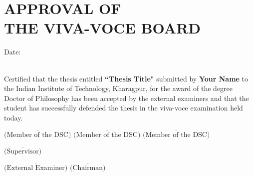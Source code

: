\chapter[Approval]{APPROVAL OF \\THE VIVA-VOCE BOARD}

\hspace{0pt plus 1filll} Date: \underline{\hspace{2.9cm}}\\
 
\hspace{0pt plus 1filll} \\
  
 \begin{Spacing}{1.5}
 	\sffamily
 	
\noindent 	
 Certified that the thesis entitled \textbf{``Thesis Title"} submitted by \textbf{Your Name} to the Indian Institute of Technology, Kharagpur, for the award of the degree Doctor of Philosophy has been accepted by the external examiners and that the student has successfully defended the thesis in the viva-voce examination held today.

\end{Spacing}

\vspace{2.5cm}

\noindent
 $\overline{\mbox{(Member of the DSC)}}$ \hspace{0pt plus 1filll} 
  $\overline{\mbox{(Member of the DSC)}}$ \hspace{0pt plus 1filll}  
  $\overline{\mbox{(Member of the DSC)}}$\\
 
\vspace{1.5cm}
    
\hspace{0pt plus 1filll} $\overline{\mbox{(Supervisor)}}$\\
 
\vspace{1.5cm}

$\overline{\mbox{(External Examiner)}}$ \hspace{0pt plus 1filll}  $\overline{\mbox{(Chairman)}}$